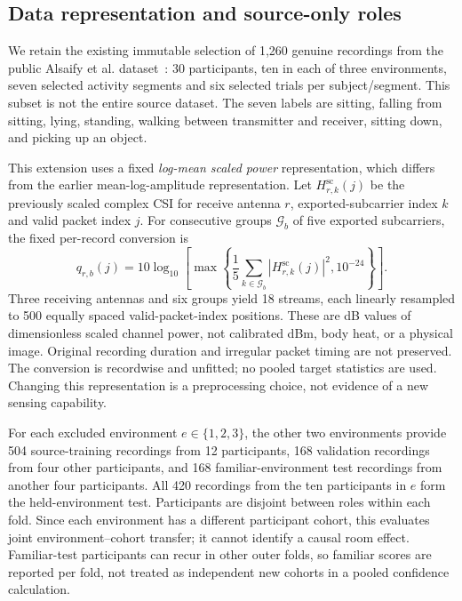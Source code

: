 \subsection*{Data representation and source-only roles}
We retain the existing immutable selection of 1,260 genuine recordings from
the public Alsaify et al. dataset~\cite{multienvdata}: 30 participants, ten in each
of three environments, seven selected activity segments and six selected
trials per subject/segment. This subset is not the entire source dataset.
The seven labels are sitting, falling from sitting, lying, standing, walking
between transmitter and receiver, sitting down, and picking up an object.

This extension uses a fixed \emph{log-mean scaled power} representation, which
differs from the earlier mean-log-amplitude representation. Let
$H^{\mathrm{sc}}_{r,k}(j)$ be the previously scaled complex CSI for receive
antenna $r$, exported-subcarrier index $k$ and valid packet index $j$.
For consecutive groups $\mathcal G_b$ of five exported subcarriers, the fixed
per-record conversion is
\begin{equation}
 q_{r,b}(j)=10\log_{10}\!\left[
 \max\!\left\{\frac{1}{5}\sum_{k\in\mathcal G_b}
 |H^{\mathrm{sc}}_{r,k}(j)|^2,10^{-24}\right\}\right].
 \label{eq:m2-power}
\end{equation}
Three receiving antennas and six groups yield 18 streams, each linearly
resampled to 500 equally spaced valid-packet-index positions. These are dB
values of dimensionless scaled channel power, not calibrated dBm, body heat,
or a physical image. Original recording duration and irregular packet timing
are not preserved. The conversion is recordwise and unfitted; no pooled target
statistics are used. Changing this representation is a preprocessing choice,
not evidence of a new sensing capability.

For each excluded environment $e\in\{1,2,3\}$, the other two environments
provide 504 source-training recordings from 12 participants, 168 validation
recordings from four other participants, and 168 familiar-environment test
recordings from another four participants. All 420 recordings from the ten
participants in $e$ form the held-environment test. Participants are disjoint
between roles within each fold. Since each environment has a different
participant cohort, this evaluates joint environment--cohort transfer; it
cannot identify a causal room effect. Familiar-test participants can recur in
other outer folds, so familiar scores are reported per fold, not treated as
independent new cohorts in a pooled confidence calculation.

